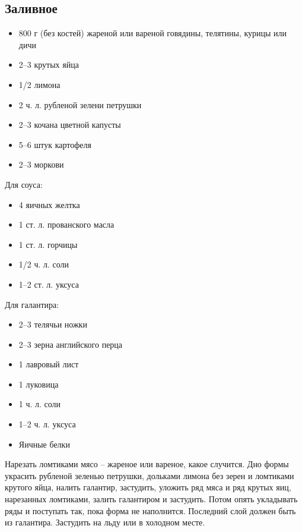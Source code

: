 \subsection{Заливное}\label{12zalivnoje}

\begin{itemize}
	\item 800 г (без костей) жареной или вареной говядины, телятины, курицы или дичи 
    \item 2–3 крутых яйца 
    \item 1/2 лимона 
    \item 2 ч. л. рубленой зелени петрушки 
    \item 2–3 кочана цветной капусты 
    \item 5–6 штук картофеля 
    \item 2–3 моркови
\end{itemize}

Для соуса: 

\begin{itemize}
	\item 4 яичных желтка
    \item 1 ст. л. прованского масла 
    \item 1 ст. л. горчицы
    \item 1/2 ч. л. соли 
    \item 1–2 ст. л. уксуса 
\end{itemize}
    
Для галантира: 
    
\begin{itemize}
	\item 2–3 телячьи ножки 
    \item 2–3 зерна английского перца
    \item 1 лавровый лист 
    \item 1 луковица 
    \item 1 ч. л. соли 
    \item 1–2 ч. л. уксуса
    \item Яичные белки
\end{itemize}

Нарезать ломтиками мясо – жареное или вареное, какое случится. Дно формы украсить рубленой зеленью петрушки, дольками лимона без зерен и ломтиками крутого яйца, налить галантир, застудить, уложить ряд мяса и ряд крутых яиц, нарезанных ломтиками, залить галантиром и застудить. Потом опять укладывать ряды и поступать так, пока форма не наполнится. Последний слой должен быть из галантира. Застудить на льду или в холодном месте.

